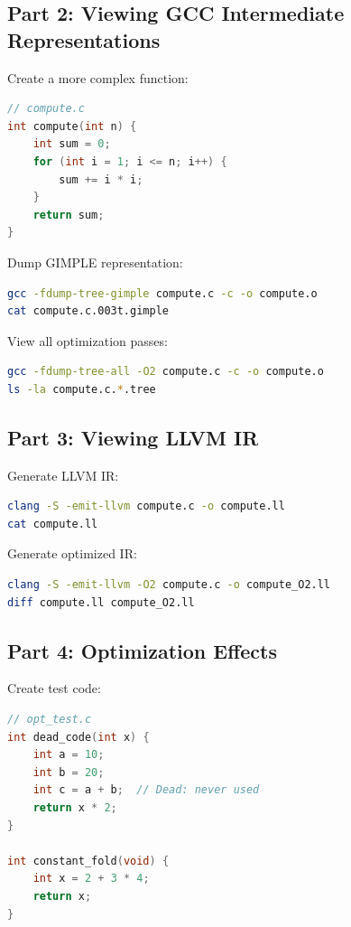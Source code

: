 \subsection{Part 2: Viewing GCC Intermediate Representations}

Create a more complex function:

\begin{lstlisting}[language=C]
// compute.c
int compute(int n) {
    int sum = 0;
    for (int i = 1; i <= n; i++) {
        sum += i * i;
    }
    return sum;
}
\end{lstlisting}

Dump GIMPLE representation:

\begin{lstlisting}[language=bash]
gcc -fdump-tree-gimple compute.c -c -o compute.o
cat compute.c.003t.gimple
\end{lstlisting}

View all optimization passes:

\begin{lstlisting}[language=bash]
gcc -fdump-tree-all -O2 compute.c -c -o compute.o
ls -la compute.c.*.tree
\end{lstlisting}

\subsection{Part 3: Viewing LLVM IR}

Generate LLVM IR:

\begin{lstlisting}[language=bash]
clang -S -emit-llvm compute.c -o compute.ll
cat compute.ll
\end{lstlisting}

Generate optimized IR:

\begin{lstlisting}[language=bash]
clang -S -emit-llvm -O2 compute.c -o compute_O2.ll
diff compute.ll compute_O2.ll
\end{lstlisting}

\subsection{Part 4: Optimization Effects}

Create test code:

\begin{lstlisting}[language=C]
// opt_test.c
int dead_code(int x) {
    int a = 10;
    int b = 20;
    int c = a + b;  // Dead: never used
    return x * 2;
}

int constant_fold(void) {
    int x = 2 + 3 * 4;
    return x;
}
\end{lstlisting}

